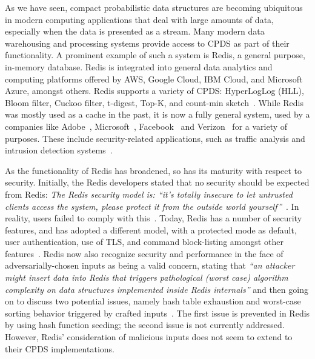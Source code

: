 As we have seen, compact probabilistic data structures are becoming ubiquitous in modern computing applications that deal with large amounts of data, especially when the data is presented as a stream. Many modern data warehousing and processing systems provide access to CPDS as part of their functionality.  A prominent example of such a system is Redis, a general purpose, in-memory database. Redis is integrated into general data analytics and computing platforms offered by AWS, Google Cloud, IBM Cloud, and Microsoft Azure, amongst others. Redis supports a variety of CPDS: HyperLogLog (HLL), Bloom filter, Cuckoo filter, t-digest, Top-K, and count-min sketch~\cite{redisPDS}. 
While Redis was mostly used as a cache in the past, it is now a fully general system, used by a companies like Adobe~\cite{Web:RedisForAdobe}, Microsoft~\cite{Web:RedisForMicrosoft}, Facebook~\cite{Web:RedisForFacebook} and Verizon~\cite{Web:RedisForVerizon} for a variety of purposes. These include security-related applications, such as traffic analysis and intrusion detection systems~\cite{Web:RedisForSiemens}.

As the functionality of Redis has broadened, so has its maturity with respect to security. Initially, the Redis developers stated that no security should be expected from Redis: \emph{
The Redis security model is: “it’s totally insecure to let untrusted clients access the system, please protect it from the outside world yourself”}~\cite{antirez15}. In reality, users failed to comply with this~\cite{FiebigFP16}. Today, Redis has a number of security features, and has adopted a different model, with a protected mode as default, user authentication, use of TLS, and command block-listing amongst other features~\cite{redisSec}. Redis now also recognize security and performance in the face of adversarially-chosen inputs as being a valid concern, stating that \emph{``an attacker might insert data into Redis that triggers pathological (worst case) algorithm complexity on data structures implemented inside Redis internals''} and then going on to discuss two potential issues, namely hash table exhaustion and worst-case sorting behavior triggered by crafted inputs~\cite{redisSec}. The first issue is prevented in Redis by using hash function seeding; the second issue is not currently addressed. However, Redis' consideration of malicious inputs does not seem to extend to their CPDS implementations.


